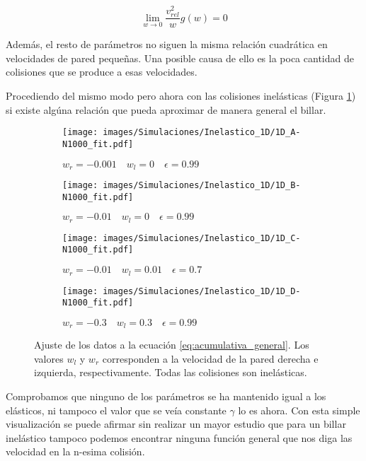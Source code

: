 \documentclass[11pt, spanish]{book}
\newcommand{\cambios}[1]{\textcolor{green!70!black}{#1}}
\begin{document}
\begin{equation}
    \lim_{w\rightarrow 0} \dfrac{v^2_{rel}}{w}g(w) = 0
\end{equation}

\cambios{Además, el resto de parámetros no siguen la misma relación cuadrática en velocidades de pared pequeñas. Una posible causa de ello es la poca cantidad de colisiones que se produce a esas velocidades.}

\vspace{3mm}

Procediendo del mismo modo pero ahora con las colisiones inelásticas (Figura \ref{fig:ajuste_1D_inelastic}) si existe algúna relación que pueda aproximar de manera general el billar. 

\begin{figure}[h]
    \begin{subfigure}[b]{0.5\textwidth}
        \centering
        \texttt{[image: images/Simulaciones/Inelastico\_1D/1D\_A-N1000\_fit.pdf]}
        \caption{$w_r = -0.001 \quad w_l = 0 \quad \epsilon = 0.99$}
    \end{subfigure}
    \hfill
    \begin{subfigure}[b]{0.5\textwidth}
        \centering
        \texttt{[image: images/Simulaciones/Inelastico\_1D/1D\_B-N1000\_fit.pdf]}
        \caption{$w_r = -0.01 \quad w_l = 0 \quad \epsilon = 0.99$}
    \end{subfigure}
    \hfill
    \begin{subfigure}[b]{0.5\textwidth}
        \centering
        \texttt{[image: images/Simulaciones/Inelastico\_1D/1D\_C-N1000\_fit.pdf]}
        \caption{$w_r = -0.01 \quad w_l = 0.01 \quad \epsilon = 0.7$}
    \end{subfigure}
    \hfill
    \begin{subfigure}[b]{0.5\textwidth}
        \centering
        \texttt{[image: images/Simulaciones/Inelastico\_1D/1D\_D-N1000\_fit.pdf]}
        \caption{$w_r = -0.3 \quad w_l = 0.3 \quad \epsilon = 0.99$}
    \end{subfigure}
    \caption{Ajuste de los datos a la ecuación \ref{eq:acumulativa_general}. Los valores \( w_l \) y \( w_r \) corresponden a la velocidad de la pared derecha e izquierda, respectivamente. Todas las colisiones son  inelásticas.}
    \label{fig:ajuste_1D_inelastic}
\end{figure}

\vspace{3mm}

Comprobamos que ninguno de los parámetros se ha mantenido igual a los elásticos, ni tampoco el valor que se veía constante \( \gamma \) lo es ahora. Con esta simple visualización se puede afirmar sin realizar un mayor estudio que para un billar inelástico tampoco podemos encontrar ninguna función general que nos diga las velocidad en la n-esima colisión. 
\end{document}
